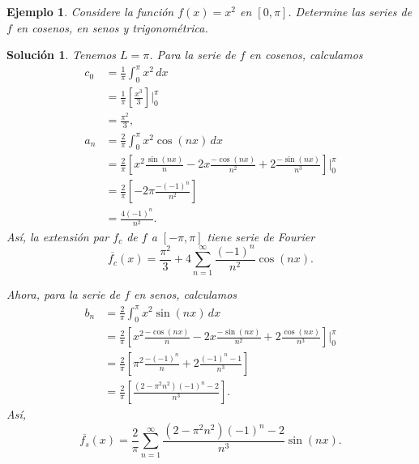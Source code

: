 \documentclass[11pt,letterpaper]{report}
\newtheorem{example}[defn]{Ejemplo}
\newtheorem*{sol}{Solución}
\newcommand\<{\langle}
\renewcommand\>{\rangle}
\begin{document}
\begin{example}
  Considere la función $f(x)=x^{2}$ en $[0,\pi]$. Determine las
  series de $f$ en cosenos, en senos y trigonométrica.
\end{example}
\begin{sol}
  Tenemos $L=\pi$. Para la serie de $f$ en cosenos, calculamos
  \begin{align*}
    c_0
    &= \frac{1}{\pi}\int_{0}^{\pi}x^{2}\,dx \\
    &= \frac{1}{\pi} \left[
      \frac{x^{3}}{3}
    \right]\Big|_{0}^{\pi} \\
    &= \frac{\pi^{2}}{3}, \\
    a_n
    &= \frac{2}{\pi}\int_{0}^{\pi}x^{2}\cos(nx)\,dx \\
    &= \frac{2}{\pi} \left[
      x^{2}\frac{\sin(nx)}{n}
      -2x\frac{-\cos(nx)}{n^{2}}
      +2\frac{-\sin(nx)}{n^{3}}
    \right]\Big|_{0}^{\pi} \\
    &= \frac{2}{\pi} \left[
      -2\pi\frac{-(-1)^{n}}{n^{2}}
    \right] \\
    &= \frac{4(-1)^{n}}{n^{2}}.
  \end{align*}
  Así, la extensión par $f_c$ de $f$ a $[-\pi,\pi]$ tiene serie de
  Fourier
  \[
    \overline{f_c}(x)
    =
    \frac{\pi^{2}}{3}
    +
    4\sum_{n=1}^{\infty}\frac{(-1)^{n}}{n^{2}}\cos(nx)
  .\]
  
  Ahora, para la serie de $f$ en senos, calculamos
  \begin{align*}
    b_n
    &= \frac{2}{\pi}\int_{0}^{\pi}x^{2}\sin(nx)\,dx \\
    &= \frac{2}{\pi} \left[
      x^{2}\frac{-\cos(nx)}{n}
      -2x\frac{-\sin(nx)}{n^{2}}
      +2\frac{\cos(nx)}{n^{3}}
    \right]\Big|_{0}^{\pi} \\
    &= \frac{2}{\pi} \left[
      \pi^{2}\frac{-(-1)^{n}}{n}+2\frac{(-1)^{n}-1}{n^{3}}
    \right] \\
    &= \frac{2}{\pi} \left[
      \frac{(2-\pi^{2}n^{2})(-1)^{n}-2}{n^{3}}
    \right].
  \end{align*}
  Así,
  \[
    \overline{f_s}(x)
    =
    \frac{2}{\pi}\sum_{n=1}^{\infty}
      \frac{(2-\pi^{2}n^{2})(-1)^{n}-2}{n^{3}}
      \sin(nx)
  .\]
  

\end{sol}
\end{document}
